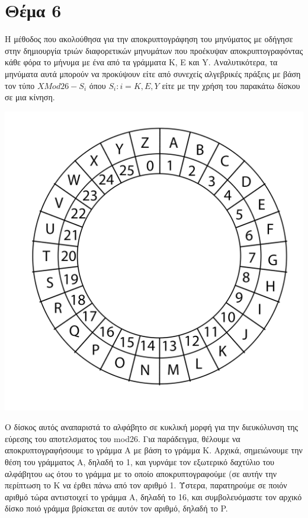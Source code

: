 \documentclass[a4paper, 11pt]{article}
\newcommand{\lt}{\latintext}
\begin{document}
\newpage
\section*{Θέμα 6}

Η μέθοδος που ακολούθησα για την αποκρυπτογράφηση του μηνύματος με οδήγησε στην δημιουργία τριών διαφορετικών μηνυμάτων που προέκυψαν αποκρυπτογραφόντας κάθε φόρα το μήνυμα με ένα από τα γράμματα {\lt K}, {\lt E} και {\lt Y}. Αναλυτικότερα, τα μηνύματα αυτά μπορούν να προκύψουν είτε από συνεχείς αλγεβρικές πράξεις με βάση τον τύπο $ X  Μod 26 - S_{i} $ όπου $S_{i} : i = {K, E, Y} $ είτε με την χρήση του παρακάτω δίσκου σε μια κίνηση.

\centerline{\includegraphics[scale=0.5]{disk.png}}

Ο δίσκος αυτός αναπαριστά το αλφάβητο σε κυκλική μορφή για την διευκόλυνση της εύρεσης του αποτελσματος του {\lt mod26}.
Για παράδειγμα, θέλουμε να αποκρυπτογραφήσουμε το γράμμα Α με βάση το γράμμα Κ.
Αρχικά, σημειώνουμε την θέση του γράμματος Α, δηλαδή το 1, και γυρνάμε τον εξωτερικό δαχτύλιο του αλφάβητου ως ότου το γράμμα με το οποίο αποκρυπτογραφούμε (σε αυτήν την περίπτωση το Κ να έρθει πάνω από τον αριθμό 1. Ύστερα, παρατηρούμε σε ποιόν αριθμό τώρα αντιστοιχεί το γράμμα Α, δηλαδή το 16, και συμβολευόμαστε τον αρχικό δίσκο ποιό γράμμα βρίσκεται σε αυτόν τον αριθμό, δηλαδή το {\lt P}.
\end{document}
